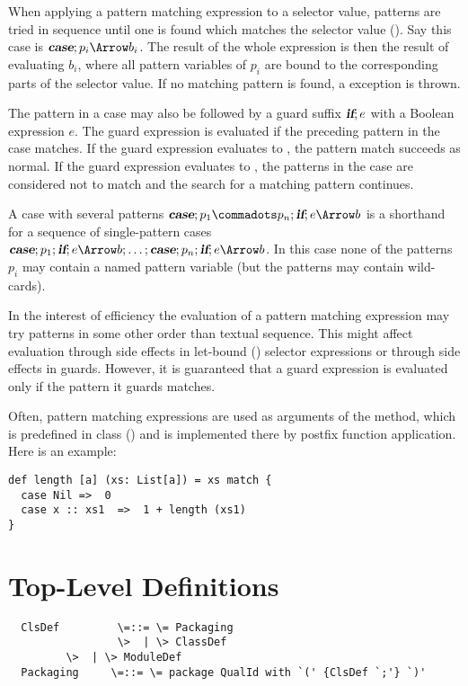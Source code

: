 \documentclass[11pt]{report}
\begin{document}
\begin{itemize}
When applying a pattern matching expression to a selector value,
patterns are tried in sequence until one is found which matches the
selector value (). Say this case is $\CASE;p_i
\Arrow b_i$.  The result of the whole expression is then the result of
evaluating $b_i$, where all pattern variables of $p_i$ are bound to
the corresponding parts of the selector value.  If no matching pattern
is found, a \verb@MatchError@ exception is thrown.

The pattern in a case may also be followed by a guard suffix $\mbox{\sl\bfseries if};e$
with a Boolean expression $e$.  The guard expression is evaluated if
the preceding pattern in the case matches. If the guard expression
evaluates to \verb@True@, the pattern match succeeds as normal. If the
guard expression evaluates to \verb@False@, the patterns in the case
are considered not to match and the search for a matching pattern
continues.

A case with several patterns $\CASE;p_1 \commadots p_n ;\IF; e \Arrow b$  is a
shorthand for a sequence of single-pattern cases $\CASE;p_1;\IF;e \Arrow b
;\ldots; \CASE;p_n ;\IF;e\Arrow b$. In this case none of the patterns
$p_i$ may contain a named pattern variable (but the patterns may contain
wild-cards).

In the interest of efficiency the evaluation of a pattern matching
expression may try patterns in some other order than textual
sequence. This might affect evaluation through side effects in
let-bound () selector expressions or through side
effects in guards. However, it is guaranteed that a guard expression
is evaluated only if the pattern it guards matches.


\example
Often, pattern matching expressions are used as arguments
of the \verb@match@ method, which is predefined in class \verb@Any@
() and is implemented there by postfix function
application. Here is an example:
\begin{verbatim}
def length [a] (xs: List[a]) = xs match {
  case Nil =>  0
  case x :: xs1  =>  1 + length (xs1)
}
\end{verbatim}

\chapter{Top-Level Definitions}
\label{sec:topdefs}

\syntax\begin{verbatim}
  ClsDef         \=::= \= Packaging
                 \>  | \> ClassDef
		 \>  | \> ModuleDef
  Packaging     \=::= \= package QualId with `(' {ClsDef `;'} `)'
\end{verbatim}


\end{itemize}
\end{document}
